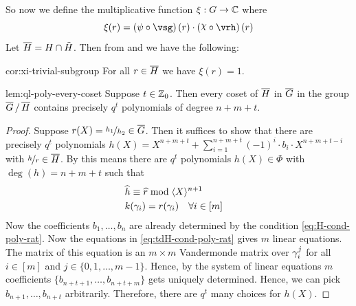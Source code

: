So now we define the multiplicative function $\xi:G\to\mathbb{C}$ where $$\xi(r)=\lt(\psi\circ\vsg\rt)(r)\cdot \lt(\chi\circ\vrh\rt)(r)$$
Let $\overline{H}=H\cap \tilde{H}$. Then from  and  we have the following:
\begin{corolary}{}{cor:xi-trivial-subgroup}
  For all $r\in \overline{H}$ we have $\xi(r)=1$. 
\end{corolary}
\begin{lemma}{}{lem:ql-poly-every-coset}
  Suppose $t\in\mathbb{Z}_0$. Then every coset of $\overline{H}$ in $\overline{G}$ in the group $\quotient{\ovG}{\ovH}$ contains precisely $q^t$ polynomials of degree $n+m+t$. 
\end{lemma}
\begin{proof}
  Suppose $r(X)=\nicefrac{h_1}{h_2}\in \overline{G}$. Then it suffices to show that there are precisely $q^t$ polynomials $h(X)=X^{n+m+t}+\sum_{i=1}^{n+m+t}(-1)^i\cdot b_i\cdot X^{n+m+t-i}$ with $\nicefrac{h}{r}\in\overline{H}$. By  this means there are $q^t$ polynomials $h(X)\in\Phi$ with $\deg(h)=n+m+t$ such that \begin{align}
    &\widehat{h} \equiv \widehat{r}\bmod{\langle X\rangle^{n+1}} \label{eq:H-cond-poly-rat}&\\
    &k(\gamma_i) = r(\gamma_i) \quad \forall i\in[m] \label{eq:tdH-cond-poly-rat}&
  \end{align}  Now the coefficients $b_1,\dots, b_n$ are already determined by the condition \eqref{eq:H-cond-poly-rat}. Now the equations in \eqref{eq:tdH-cond-poly-rat} gives $m$ linear equations. The matrix of this equation is an $m\times m$ Vandermonde matrix over $\gamma_i^j$ for all $i\in[m]$ and $j\in\{0,1,\dots, m-1\}$. Hence, by the system of linear equations $m$ coefficients $\{b_{n+t+1},\dots, b_{n+t+m}\}$ gets uniquely determined. Hence, we can pick $b_{n+1},\dots, b_{n+t}$ arbitrarily. Therefore, there are $q^t$ many choices for $h(X)$. 
\end{proof}